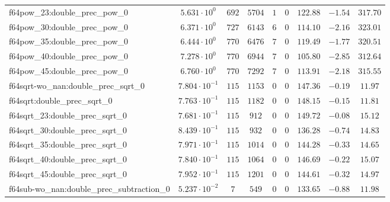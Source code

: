 \begin{tabular}{|l|c|c|c|c|c|c|c|c|}
f64pow\_23:double\_prec\_pow\_0                & $ 5.631 \cdot 10^{0}  $ & $ 692    $ & $ 5704   $ & $ 1   $ & $ 0      $ & $ 122.88      $ & $ -1.54   $ & $ 317.70  $ \\
f64pow\_30:double\_prec\_pow\_0                & $ 6.371 \cdot 10^{0}  $ & $ 727    $ & $ 6143   $ & $ 6   $ & $ 0      $ & $ 114.10      $ & $ -2.16   $ & $ 323.01  $ \\
f64pow\_35:double\_prec\_pow\_0                & $ 6.444 \cdot 10^{0}  $ & $ 770    $ & $ 6476   $ & $ 7   $ & $ 0      $ & $ 119.49      $ & $ -1.77   $ & $ 320.51  $ \\
f64pow\_40:double\_prec\_pow\_0                & $ 7.278 \cdot 10^{0}  $ & $ 770    $ & $ 6944   $ & $ 7   $ & $ 0      $ & $ 105.80      $ & $ -2.85   $ & $ 312.64  $ \\
f64pow\_45:double\_prec\_pow\_0                & $ 6.760 \cdot 10^{0}  $ & $ 770    $ & $ 7292   $ & $ 7   $ & $ 0      $ & $ 113.91      $ & $ -2.18   $ & $ 315.55  $ \\
f64sqrt-wo\_nan:double\_prec\_sqrt\_0          & $ 7.804 \cdot 10^{-1} $ & $ 115    $ & $ 1153   $ & $ 0   $ & $ 0      $ & $ 147.36      $ & $ -0.19   $ & $ 11.97   $ \\
f64sqrt:double\_prec\_sqrt\_0                  & $ 7.763 \cdot 10^{-1} $ & $ 115    $ & $ 1182   $ & $ 0   $ & $ 0      $ & $ 148.15      $ & $ -0.15   $ & $ 11.81   $ \\
f64sqrt\_23:double\_prec\_sqrt\_0              & $ 7.681 \cdot 10^{-1} $ & $ 115    $ & $ 912    $ & $ 0   $ & $ 0      $ & $ 149.72      $ & $ -0.08   $ & $ 15.12   $ \\
f64sqrt\_30:double\_prec\_sqrt\_0              & $ 8.439 \cdot 10^{-1} $ & $ 115    $ & $ 932    $ & $ 0   $ & $ 0      $ & $ 136.28      $ & $ -0.74   $ & $ 14.83   $ \\
f64sqrt\_35:double\_prec\_sqrt\_0              & $ 7.971 \cdot 10^{-1} $ & $ 115    $ & $ 1014   $ & $ 0   $ & $ 0      $ & $ 144.28      $ & $ -0.33   $ & $ 14.65   $ \\
f64sqrt\_40:double\_prec\_sqrt\_0              & $ 7.840 \cdot 10^{-1} $ & $ 115    $ & $ 1064   $ & $ 0   $ & $ 0      $ & $ 146.69      $ & $ -0.22   $ & $ 15.07   $ \\
f64sqrt\_45:double\_prec\_sqrt\_0              & $ 7.952 \cdot 10^{-1} $ & $ 115    $ & $ 1201   $ & $ 0   $ & $ 0      $ & $ 144.61      $ & $ -0.32   $ & $ 14.97   $ \\
f64sub-wo\_nan:double\_prec\_subtraction\_0    & $ 5.237 \cdot 10^{-2} $ & $ 7      $ & $ 549    $ & $ 0   $ & $ 0      $ & $ 133.65      $ & $ -0.88   $ & $ 11.98   $ \\

\end{tabular}
